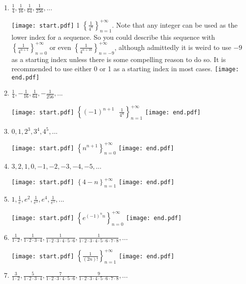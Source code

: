 \documentclass[12pt]{article}
\begin{document}
\begin{enumerate}

\item $\frac{1}{4}, \frac{1}{16}, \frac{1}{64}, \frac{1}{256}, ...$

\texttt{[image: start.pdf]}
{{{1\linewidth}{ $\left\{ \frac{1}{4^n} \right\}_{n = 1}^{+\infty}$.  Note that any integer can be used as the lower index for a sequence.  So you could describe this sequence with 
$\left\{ \frac{1}{4^{n+1}} \right\}_{n = 0}^{+\infty}$ or even $\left\{ \frac{1}{4^{n+10}} \right\}_{n = -9}^{+\infty}$, although admittedly it is weird to use $-9$ as a starting index unless 
there is some compelling reason to do so.  It is recommended to use either 0 or 1 as a starting index in most cases.  }}}
\texttt{[image: end.pdf]}


\item $\frac{1}{4}, -\frac{1}{16}, \frac{1}{64}, -\frac{1}{256},...$

\texttt{[image: start.pdf]}
{{ $\left\{ (-1)^{n+1} \text{ } \frac{1}{4^n} \right\}_{n = 1}^{+\infty}$  }}
\texttt{[image: end.pdf]}


\item $0, 1, 2^3, 3^4, 4^5, ...$

\texttt{[image: start.pdf]}
{{ $\left\{ n^{n+1} \right\}_{n = 0}^{+\infty}$  }}
\texttt{[image: end.pdf]}


\item $3, 2, 1, 0, -1, -2, -3, -4, -5, ...$

\texttt{[image: start.pdf]}
{{ $\left\{ 4-n \right\}_{n = 1}^{+\infty}$  }}
\texttt{[image: end.pdf]}


\item $1, \frac{1}{e}, e^2, \frac{1}{e^3}, e^4, \frac{1}{e^5}, ...$

\texttt{[image: start.pdf]}
{{ $\left\{  e^{(-1)^nn}  \right\}_{n = 0}^{+\infty}$  }}
\texttt{[image: end.pdf]}


\item $\frac{1}{1 \cdot 2}, \frac{1}{1 \cdot 2 \cdot 3 \cdot 4}, \frac{1}{1 \cdot 2 \cdot 3 \cdot 4 \cdot 5 \cdot 6}, \frac{1}{1 \cdot 2 \cdot 3 \cdot 4 \cdot 5 \cdot 6 \cdot 7 \cdot 8}, ...$

\texttt{[image: start.pdf]}
{{ $\left\{  \frac{1}{(2n)!} \right\}_{n = 1}^{+\infty}$  }}
\texttt{[image: end.pdf]}


\item $\frac{3}{1 \cdot 2}, \frac{5}{1 \cdot 2 \cdot 3 \cdot 4}, \frac{7}{1 \cdot 2 \cdot 3 \cdot 4 \cdot 5 \cdot 6}, \frac{9}{1 \cdot 2 \cdot 3 \cdot 4 \cdot 5 \cdot 6 \cdot 7 \cdot 8}, ...$


\end{enumerate}
\end{document}
